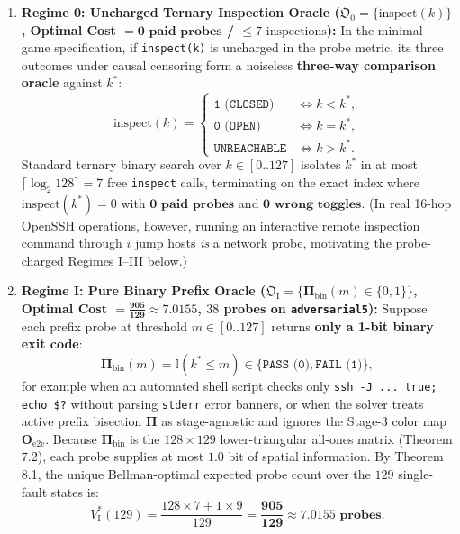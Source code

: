 \documentclass[11pt,a4paper]{article}
\theoremstyle{definition}
\theoremstyle{remark}
\begin{document}
\begin{enumerate}[leftmargin=1.6em]
    \item \textbf{Regime 0: Uncharged Ternary Inspection Oracle ($\mathfrak{O}_0 = \{\text{inspect}(k)\}$, Optimal Cost $= \mathbf{0\text{ paid probes}}$ / $\le 7\text{ inspections}$):}
    In the minimal game specification, if \texttt{inspect(k)} is uncharged in the probe metric, its three outcomes under causal censoring form a noiseless \textbf{three-way comparison oracle} against $k^*$:
    \begin{equation}
        \text{inspect}(k) = \begin{cases}
            \texttt{1 (CLOSED)} & \iff k < k^*, \\
            \texttt{0 (OPEN)}   & \iff k = k^*, \\
            \texttt{UNREACHABLE} & \iff k > k^*.
        \end{cases}
    \end{equation}
    Standard ternary binary search over $k \in [0..127]$ isolates $k^*$ in at most $\lceil \log_2 128 \rceil = 7$ free \texttt{inspect} calls, terminating on the exact index where $\text{inspect}(k^*) = 0$ with $\mathbf{0\text{ paid probes}}$ and $\mathbf{0\text{ wrong toggles}}$. (In real 16-hop OpenSSH operations, however, running an interactive remote inspection command through $i$ jump hosts \emph{is} a network probe, motivating the probe-charged Regimes I--III below.)

    \item \textbf{Regime I: Pure Binary Prefix Oracle ($\mathfrak{O}_{\text{I}} = \{\bm{\Pi}_{\text{bin}}(m) \in \{0, 1\}\}$, Optimal Cost $= \mathbf{\frac{905}{129} \approx 7.0155}$, $38$ probes on \texttt{adversarial5}):}
    Suppose each prefix probe at threshold $m \in [0..127]$ returns \textbf{only a 1-bit binary exit code}:
    \begin{equation}
        \bm{\Pi}_{\text{bin}}(m) = \mathbb{I}(k^* \le m) \in \{\texttt{PASS (0)}, \texttt{FAIL (1)}\},
    \end{equation}
    for example when an automated shell script checks only \texttt{ssh -J ... true; echo \$?} without parsing \texttt{stderr} error banners, or when the solver treats active prefix bisection $\bm{\Pi}$ as stage-agnostic and ignores the Stage-3 color map $\bm{O}_{\text{e2e}}$. Because $\bm{\Pi}_{\text{bin}}$ is the $128 \times 129$ lower-triangular all-ones matrix (Theorem 7.2), each probe supplies at most $1.0\text{ bit}$ of spatial information. By Theorem 8.1, the unique Bellman-optimal expected probe count over the $129$ single-fault states is:
    \begin{equation}
        V_{\text{I}}^*(129) = \frac{128 \times 7 + 1 \times 9}{129} = \mathbf{\frac{905}{129} \approx 7.0155\text{ probes}}.
    \end{equation}


\end{enumerate}
\end{document}
